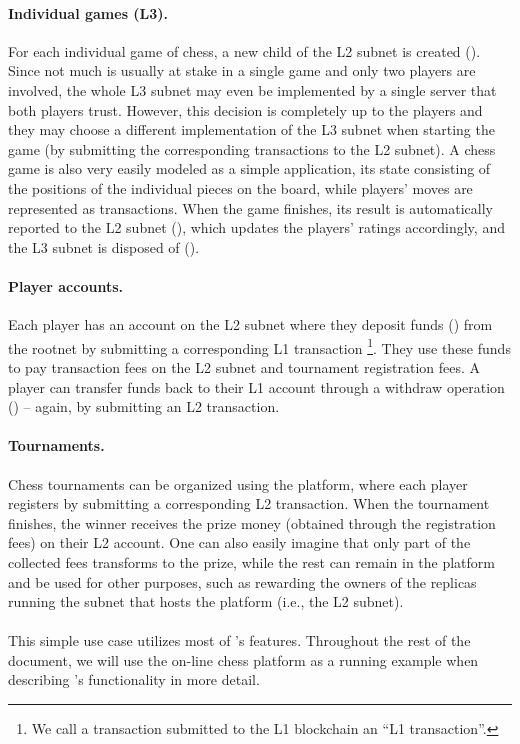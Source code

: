 \paragraph{Individual games (L3).}
For each individual game of chess, a new child of the L2 subnet is created ().
Since not much is usually at stake in a single game and only two players are involved,
the whole L3 subnet may even be implemented by a single server that both players trust.
However, this decision is completely up to the players and they may choose a different implementation of the L3 subnet
when starting the game (by submitting the corresponding transactions to the L2 subnet).
A chess game is also very easily modeled as a simple application, its state consisting of the positions of the individual pieces on the board,
while players' moves are represented as transactions.
When the game finishes, its result is automatically reported to the L2 subnet (), which updates the players' ratings accordingly,
and the L3 subnet is disposed of ().

\paragraph{Player accounts.}
Each player has an account on the L2 subnet where they deposit funds () from the rootnet by submitting a corresponding L1 transaction%
\footnote{We call a transaction submitted to the L1 blockchain an ``L1 transaction''.}.
They use these funds to pay transaction fees on the L2 subnet and tournament registration fees.
A player can transfer funds back to their L1 account through a withdraw operation () -- again, by submitting an L2 transaction.

\paragraph{Tournaments.}
Chess tournaments can be organized using the platform, where each player registers by submitting a corresponding L2 transaction.
When the tournament finishes, the winner receives the prize money (obtained through the registration fees) on their L2 account.
One can also easily imagine that only part of the collected fees transforms to the prize, while the rest can remain in the platform
and be used for other purposes, such as rewarding the owners of the replicas running the subnet that hosts the platform (i.e., the L2 subnet).

\paragraph{}
This simple use case utilizes most of \ipc's features.
Throughout the rest of the document, we will use the on-line chess platform as a running example when describing \ipc's functionality in more detail.
